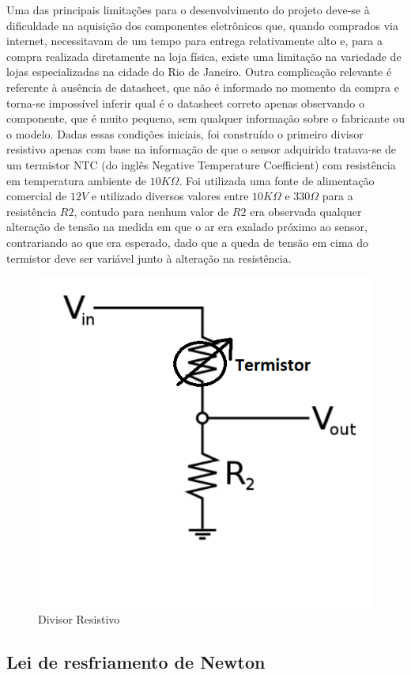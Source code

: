 Uma das principais limitações para o desenvolvimento do projeto deve-se à dificuldade na aquisição dos componentes eletrônicos que, quando comprados via internet, necessitavam de um tempo para entrega relativamente alto e, para a compra realizada diretamente na loja física, existe uma limitação na variedade de lojas especializadas na cidade do Rio de Janeiro. Outra complicação relevante é referente à ausência de datasheet, que não é informado no momento da compra e torna-se impossível inferir qual é o datasheet correto apenas observando o componente, que é muito pequeno, sem qualquer informação sobre o fabricante ou o modelo. Dadas essas condições iniciais, foi construído o primeiro divisor resistivo apenas com base na informação de que o sensor adquirido tratava-se de um termistor NTC (do inglês Negative Temperature Coefficient) com resistência em temperatura ambiente de $10K\Omega$. Foi utilizada uma fonte de alimentação comercial de $12V$ e utilizado diversos valores entre $10K\Omega$ e $330\Omega$ para a resistência $R2$, contudo para nenhum valor de $R2$ era observada qualquer alteração de tensão na medida em que o ar era exalado próximo ao sensor, contrariando ao que era esperado, dado que a queda de tensão em cima do termistor deve ser variável junto à alteração na resistência.
 
\begin{figure}[h!]
	\begin{center}
 		\includegraphics[width=0.5\linewidth]{images/divisor_resistivo.png}
 		\caption{Divisor Resistivo}
 		\label{fig:divisorResistivo}
 	\end{center}
\end{figure}
 
\subsection{Lei de resfriamento de Newton} 
 
